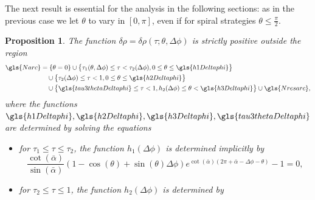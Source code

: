 \documentclass[reqno]{amsart}
\theoremstyle{definition} \newtheorem{definition}{Definition}[section]
\theoremstyle{definition} \newtheorem{remark}[definition]{Remark}
\theoremstyle{plain} \newtheorem{lemma}[definition]{Lemma}
\theoremstyle{plain} \newtheorem{proposition}[definition]{Proposition}
\theoremstyle{plain} \newtheorem{theorem}[definition]{Theorem}
\theoremstyle{plain} \newtheorem{corollary}[definition]{Corollary}
\theoremstyle{definition} \newtheorem{example}[definition]{Example}
\theoremstyle{plain} \newtheorem{claim}[clai]{Claim}
\theoremstyle{definition} \newtheorem{assumption}[definition]{Assumption}
\theoremstyle{definition} \newtheorem{observation}[definition]{Observation}
\newcommand{\1}{\mathbbm 1}
\numberwithin{equation}{section} %
\theoremstyle{plain} \newtheorem*{theorem*}{Theorem}
\theoremstyle{plain} \newtheorem{mthm}[maintheorem]{Main Theorem}
\theoremstyle{plain} \newtheorem*{mthm*}{Main Theorem}
\theoremstyle{plain} \newtheorem*{conjecture*}{Conjecture}
\theoremstyle{plain} \newtheorem{conjecture}[definition]{Conjecture}
\theoremstyle{plain} \newtheorem*{problem*}{Problem}
\begin{document}
The next result is essential for the analysis in the following sections: as in the previous case we let $\theta$ to vary in $[0,\pi]$, even if for spiral strategies $\theta \leq \frac{\pi}{2}$.

\begin{proposition}
\label{Prop:neg_region}
The function $\delta \rho = \delta \rho(\tau;\theta,\Delta \phi)$ is strictly positive outside the region      
\begin{align*}
\gls{Narc} &= \{\theta = 0\} \cup \big\{ \tau_1(\theta,\Delta \phi) \leq \tau < \tau_2(\Delta \phi), 0 \leq \theta \leq \gls{h1Deltaphi} \big\} \\
&\quad \cup \big\{\tau_2(\Delta \phi) \leq \tau < 1, 0 \leq \theta \leq \gls{h2Deltaphi} \big\} \\
&\quad \cup \big\{ \gls{tau3thetaDeltaphi} \leq \tau < 1, h_2(\Delta \phi) \leq \theta < \gls{h3Deltaphi} \big\} \cup \gls{Nresarc}, %
\end{align*}
where the functions $\gls{h1Deltaphi},\gls{h2Deltaphi},\gls{h3Deltaphi},\gls{tau3thetaDeltaphi}$ are determined by solving the equations
\begin{itemize}
\item for $\tau_1 \leq \tau \leq \tau_2$, the function $h_1(\Delta \phi)$ is determined implicitly by
\begin{equation}
\label{Equa:theta_Deltaphi_rel}
\frac{\cot(\bar \alpha)}{\sin(\bar \alpha)} (1 - \cos(\theta) + \sin(\theta) \Delta \phi) e^{\cot(\bar \alpha) (2\pi + \bar \alpha - \Delta \phi - \theta)} - 1 = 0,
\end{equation}
\item for $\tau_2 \leq \tau \leq 1$, the function $h_2(\Delta \phi)$ is determined by

\end{itemize}
\end{proposition}
\end{document}
